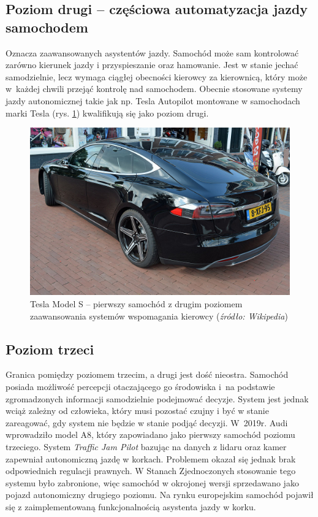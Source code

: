 \subsection{Poziom drugi -- częściowa automatyzacja jazdy samochodem}
Oznacza zaawansowanych asystentów jazdy. 
Samochód może sam kontrolować zarówno kierunek jazdy i przyspieszanie oraz hamowanie. 
Jest w stanie jechać samodzielnie, lecz wymaga ciągłej obecności kierowcy za kierownicą, który może w~każdej chwili przejąć kontrolę nad samochodem. 
Obecnie stosowane systemy jazdy autonomicznej takie jak np. Tesla Autopilot montowane w samochodach marki Tesla (rys. \ref{fig:teslas}) kwalifikują się jako poziom drugi.

\begin{figure}
  \centering
  \includegraphics[width=12cm]{img/tesla.jpg}
  \caption{Tesla Model S -- pierwszy samochód z drugim poziomem zaawansowania systemów wspomagania kierowcy (\textit{źródło: Wikipedia})}
  \label{fig:teslas}
\end{figure}

\subsection{Poziom trzeci}

Granica pomiędzy poziomem trzecim, a drugi jest dość nieostra. 
Samochód posiada możliwość percepcji otaczającego go środowiska i~na podstawie zgromadzonych informacji samodzielnie podejmować decyzje. 
System jest jednak wciąż zależny od człowieka, który musi pozostać czujny i być w stanie zareagować, gdy system nie będzie w stanie podjąć decyzji. 
W~2019r. Audi wprowadziło model A8, który zapowiadano jako pierwszy samochód poziomu trzeciego. 
System \textit{Traffic Jam Pilot} bazując na danych z lidaru oraz kamer zapewniał autonomiczną jazdę w korkach. 
Problemem okazał się jednak brak odpowiednich regulacji prawnych. 
W Stanach Zjednoczonych stosowanie tego systemu było zabronione, więc samochód w okrojonej wersji sprzedawano jako pojazd autonomiczny drugiego poziomu. 
Na rynku europejskim samochód pojawił się z zaimplementowaną funkcjonalnością asystenta jazdy w korku.

